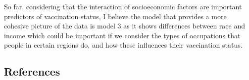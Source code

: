 \documentclass[
  letterpaper,
  DIV=11,
  numbers=noendperiod]{scrartcl}
\begin{document}
So far, considering that the interaction of socioeconomic factors are
important predictors of vaccination status, I believe the model that
provides a more cohesive picture of the data is model 3 as it shows
differences between race and income which could be important if we
consider the types of occupations that people in certain regions do, and
how these influences their vaccination status.

\begin{table}

\end{table}

\FloatBarrier

\hypertarget{references}{%
\subsection{References}\label{references}}
\end{document}
